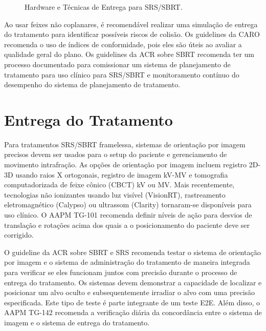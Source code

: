\documentclass[11pt,a4paper]{article}
\begin{document}
	\begin{figure}[h]
		\centering
		\caption{Hardware e Técnicas de Entrega para SRS/SBRT.}
		\label{fig:srsTecnicas}
	\end{figure}

	Ao usar feixes não coplanares, é recomendável realizar uma simulação de entrega do tratamento para identificar possíveis riscos de colisão. Os guidelines da CARO recomenda o uso de índices de conformidade, pois eles são úteis ao avaliar a qualidade geral do plano. Os guidelines da ACR sobre SBRT recomenda ter um processo documentado para comissionar um sistema de planejamento de tratamento para uso clínico para SRS/SBRT e monitoramento contínuo do desempenho do sistema de planejamento de tratamento.

\section{Entrega do Tratamento}

	Para tratamentos SRS/SBRT framelessa, sistemas de orientação por imagem precisos devem ser usados para o setup do paciente e gerenciamento de movimento intrafração. As opções de orientação por imagem incluem registro 2D-3D usando raios X ortogonais, registro de imagem kV-MV e tomografia computadorizada de feixe cônico (CBCT) kV ou MV. Mais recentemente, tecnologias não ionizantes usando luz visível (VisionRT), rastreamento eletromagnético (Calypso) ou ultrassom (Clarity) tornaram-se disponíveis para uso clínico. O AAPM TG-101 recomenda definir níveis de ação para desvios de translação e rotações acima dos quais a o posicionamento do paciente deve ser corrigido. 

	O guideline da ACR sobre SBRT e SRS recomenda testar o sistema de orientação por imagem e o sistema de administração do tratamento de maneira integrada para verificar se eles funcionam juntos com precisão durante o processo de entrega do tratamento. Os sistemas devem demonstrar a capacidade de localizar e posicionar um alvo oculto e subsequentemente irradiar o alvo com uma precisão especificada. Este tipo de teste é parte integrante de um teste E2E. Além disso, o AAPM TG-142 recomenda a verificação diária da concordância entre o sistema de imagem e o sistema de entrega do tratamento.
\end{document}
